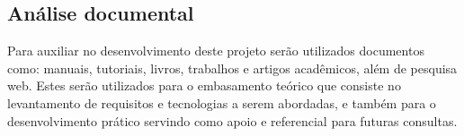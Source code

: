 \subsection{Análise documental}

\par Para auxiliar no desenvolvimento deste projeto serão utilizados documentos como: manuais, tutoriais, livros, trabalhos e artigos acadêmicos, além de pesquisa web. Estes serão utilizados para o embasamento teórico que consiste no levantamento de requisitos e tecnologias a serem abordadas, e também para o desenvolvimento prático servindo como apoio e referencial para futuras consultas.
